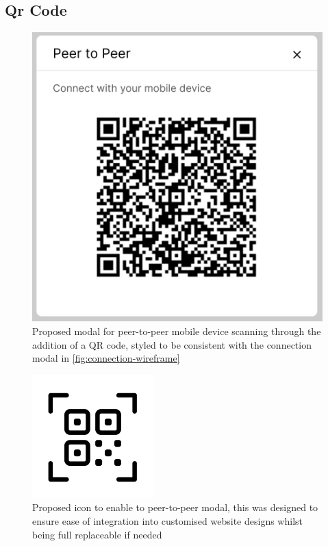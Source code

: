 \documentclass{l4proj}
\begin{document}
\begin{appendices}
\section{Qr Code}

\begin{figure}[H]
    \centering
    \includegraphics[width=12cm]{dissertation/images/wireframe-qr.png}
    \caption{Proposed modal for peer-to-peer mobile device scanning through the addition of a QR code, styled to be consistent with the connection modal in \ref{fig:connection-wireframe}}
    \label{fig:qr-wireframe}
\end{figure}

\begin{figure}[H]
    \centering
    \includegraphics{dissertation/images/wireframe-qr-icon.png}
    \caption{Proposed icon to enable to peer-to-peer modal, this was designed to ensure ease of integration into customised website designs whilst being full replaceable if needed}
    \label{fig:qr-icon-wireframe}
\end{figure}


\end{appendices}
\end{document}
